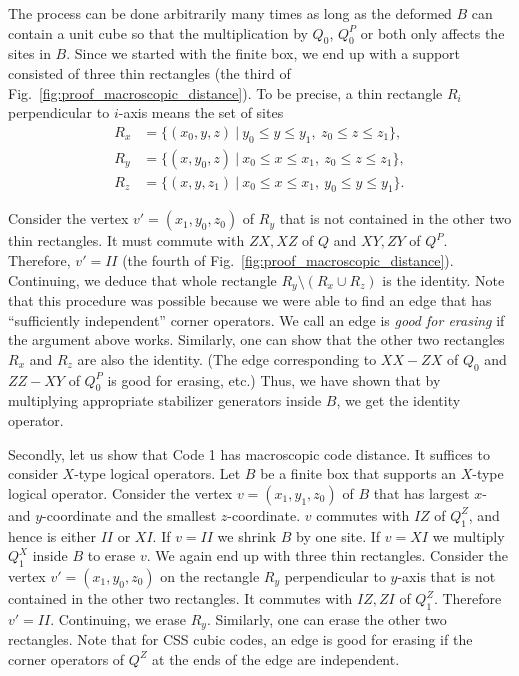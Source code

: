 \documentclass[letterpaper,10pt,pra,aps,showpacs,twocolumn]{revtex4-1}
\theoremstyle{definition} \newtheorem{defn}{Definition}
\theoremstyle{definition} \newtheorem{remark}{Remark}
\begin{document}
The process can be done arbitrarily many times as long as the deformed $B$ can contain a unit cube so that the multiplication by $Q_0$, $Q_0^P$ or both only affects the sites in $B$. Since we started with the finite box, we end up with a support consisted of three thin rectangles (the third of Fig.~\ref{fig:proof_macroscopic_distance}). To be precise, a thin rectangle $R_i$ perpendicular to $i$-axis means the set of sites
\begin{align*}
R_x &= \{ (x_0,y,z) ~|~ y_0 \le y \le y_1,~ z_0 \le z \le z_1 \} , \\
R_y &= \{ (x,y_0,z) ~|~ x_0 \le x \le x_1,~ z_0 \le z \le z_1 \} , \\
R_z &= \{ (x,y,z_1) ~|~ x_0 \le x \le x_1,~ y_0 \le y \le y_1 \} .
\end{align*}

Consider the vertex $v'= (x_1,y_0,z_0)$ of $R_y$ that is not contained in the other two thin rectangles. It must commute with $ZX, XZ$ of $Q$ and $XY, ZY$ of $Q^P$. Therefore, $v' = II$ (the fourth of Fig.~\ref{fig:proof_macroscopic_distance}). Continuing, we deduce that whole rectangle $R_y \setminus (R_x \cup R_z)$ is the identity. Note that this procedure was possible because we were able to find an edge that has ``sufficiently independent'' corner operators. We call an edge is \emph{good for erasing} if the argument above works.
%
Similarly, one can show that the other two rectangles $R_x$ and $R_z$ are also the identity. (The edge corresponding to $XX-ZX$ of $Q_0$ and $ZZ-XY$ of $Q_0^P$ is good for erasing, etc.) Thus, we have shown that by multiplying appropriate stabilizer generators inside $B$, we get the identity operator.

Secondly, let us show that Code 1 has macroscopic code distance.
It suffices to consider $X$-type logical operators. Let $B$ be a finite box that supports an $X$-type logical operator. Consider the vertex $v=(x_1,y_1,z_0)$ of $B$ that has largest $x$- and $y$-coordinate and the smallest $z$-coordinate. $v$ commutes with $IZ$ of $Q_1^Z$, and hence is either $II$ or $XI$. If $v=II$ we shrink $B$ by one site. If $v=XI$ we multiply $Q_1^X$ inside $B$ to erase $v$. We again end up with three thin rectangles. Consider the vertex $v'=(x_1,y_0,z_0)$ on the rectangle $R_y$ perpendicular to $y$-axis that is not contained in the other two rectangles. It commutes with $IZ, ZI$ of $Q_1^Z$. Therefore $v'=II$. Continuing, we erase $R_y$. Similarly, one can erase the other two rectangles.
%
Note that for CSS cubic codes, an edge is good for erasing if the corner operators of $Q^Z$ at the ends of the edge are independent.
\end{document}
